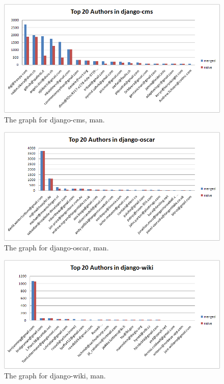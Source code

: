\begin{figure}[h]
  \centering
  \includegraphics[width=1\textwidth]{../presentation/img/graph-django-cms.png}
  \caption{The graph for django-cms, man.}
  \label{fig:graph-django-cms}
\end{figure}

\begin{figure}[h]
  \centering
  \includegraphics[width=1\textwidth]{../presentation/img/graph-django-oscar.png}
  \caption{The graph for django-oscar, man.}
  \label{fig:graph-django-oscar}
\end{figure}

\begin{figure}[h]
  \centering
  \includegraphics[width=1\textwidth]{../presentation/img/graph-django-wiki.png}
  \caption{The graph for django-wiki, man.}
  \label{fig:graph-django-wiki}
\end{figure}

